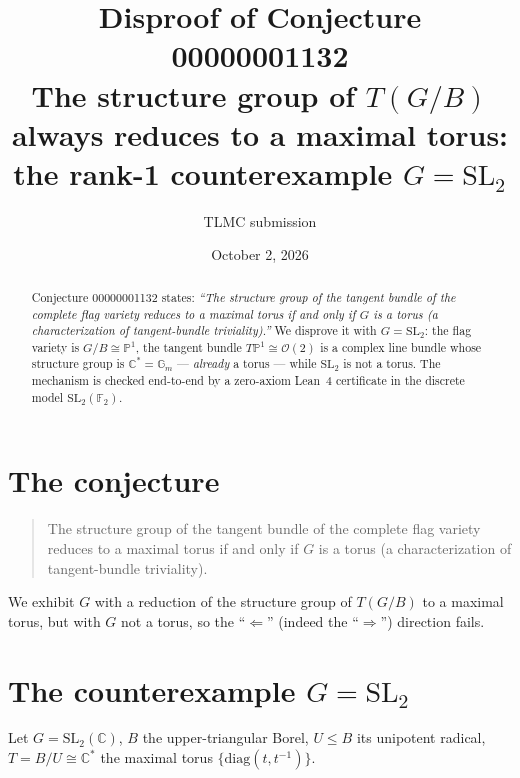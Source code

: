 \documentclass[11pt]{article}
\title{Disproof of Conjecture 00000001132\\
\large The structure group of $T(G/B)$ always reduces to a maximal torus:\\ the rank-1 counterexample $G=\mathrm{SL}_2$}
\author{TLMC submission}
\date{October 2, 2026}
\begin{document}
\maketitle

\begin{abstract}
Conjecture 00000001132 states: \emph{``The structure group of the tangent bundle of the complete flag variety reduces to a maximal torus if and only if $G$ is a torus (a characterization of tangent-bundle triviality).''}
We disprove it with $G=\mathrm{SL}_2$: the flag variety is $G/B \cong \mathbb{P}^1$, the tangent bundle $T\mathbb{P}^1 \cong \mathcal{O}(2)$ is a complex line bundle whose structure group is $\mathbb{C}^* = \mathbb{G}_m$ --- \emph{already} a torus --- while $\mathrm{SL}_2$ is not a torus.  The mechanism is checked end-to-end by a zero-axiom Lean~4 certificate in the discrete model $\mathrm{SL}_2(\mathbb{F}_2)$.
\end{abstract}

\section{The conjecture}

\begin{quote}
The structure group of the tangent bundle of the complete flag variety reduces to a maximal torus if and only if $G$ is a torus (a characterization of tangent-bundle triviality).
\end{quote}

We exhibit $G$ with a reduction of the structure group of $T(G/B)$ to a maximal torus, but with $G$ not a torus, so the ``$\Leftarrow$'' (indeed the ``$\Rightarrow$'') direction fails.

\section{The counterexample $G = \mathrm{SL}_2$}

Let $G=\mathrm{SL}_2(\mathbb{C})$, $B$ the upper-triangular Borel, $U\le B$ its unipotent radical, $T = B/U \cong \mathbb{C}^*$ the maximal torus $\{\mathrm{diag}(t,t^{-1})\}$.
\end{document}
